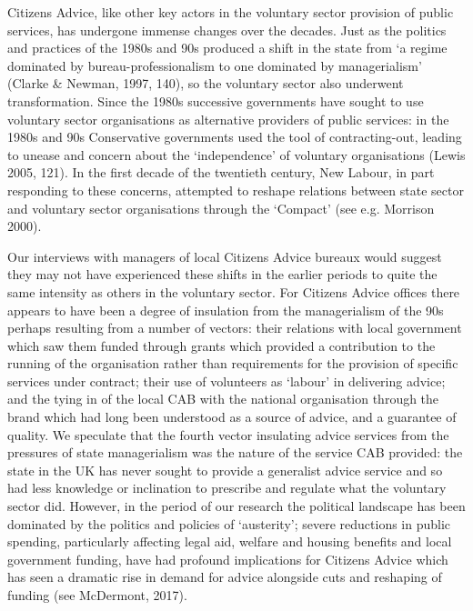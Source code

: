 \par
Citizens Advice, like other key actors in the voluntary sector provision of public services, has undergone immense changes over the decades. Just as the politics and practices of the 1980s and 90s produced a shift in the state from ‘a regime dominated by bureau-professionalism to one dominated by managerialism’ (Clarke \& Newman, 1997, 140), so the voluntary sector also underwent transformation.  Since the 1980s successive governments have sought to use voluntary sector organisations as alternative providers of public services: in the 1980s and 90s Conservative governments used the tool of contracting-out, leading to unease and concern about the ‘independence’ of voluntary organisations (Lewis 2005, 121). In the first decade of the twentieth century, New Labour, in part responding to these concerns, attempted to reshape relations between state sector and voluntary sector organisations through the ‘Compact’ (see e.g. Morrison 2000). 
\par
Our interviews with managers of local Citizens Advice bureaux would suggest they may not have experienced these shifts in the earlier periods to quite the same intensity as others in the voluntary sector. For Citizens Advice offices there appears to have been a degree of insulation from the managerialism of the 90s perhaps resulting from a number of vectors: their relations with local government which saw them funded through grants which provided a contribution to the running of the organisation rather than requirements for the provision of specific services under contract; their use of volunteers as ‘labour’ in delivering advice; and the tying in of the local CAB with the national organisation through the brand which had long been understood as a source of advice, and a guarantee of quality. We speculate that the fourth vector insulating advice services from the pressures of state managerialism was the nature of the service CAB provided: the state in the UK has never sought to provide a generalist advice service and so had less knowledge or inclination to prescribe and regulate what the voluntary sector did. However, in the period of our research the political landscape has been dominated by the politics and policies of ‘austerity’; severe reductions in public spending, particularly affecting legal aid, welfare and housing benefits and local government funding, have had profound implications for Citizens Advice which has seen a dramatic rise in demand for advice alongside cuts and reshaping of funding (see McDermont, 2017).
\par
